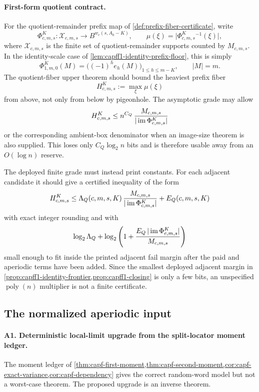 \documentclass[11pt]{article}
\theoremstyle{definition}
\theoremstyle{remark}
\newcommand{\B}{B}
\begin{document}
\paragraph{First-form quotient contract.}
For the quotient-remainder prefix map of \cref{def:prefix-fiber-certificate}, write
\[
        \Phi_{c,m,s}^{K}:\mathcal X_{c,m,s}\longrightarrow \B^{w_c(s,A_0-K)},
        \qquad
        \mu(\xi)=\bigl|\Phi_{c,m,s}^{K}{}^{-1}(\xi)\bigr|,
\]
where $\mathcal X_{c,m,s}$ is the finite set of quotient-remainder supports counted by $M_{c,m,s}$.  In the identity-scale case of \cref{lem:capff1-identity-prefix-floor}, this is simply
\[
        \Phi_{1,m,0}^{K}(M)=\bigl((-1)^he_h(M)\bigr)_{1\le h\le m-K},
        \qquad |M|=m .
\]
The quotient-fiber upper theorem should bound the heaviest prefix fiber
\[
        H_{c,m,s}^{K}:=\max_{\xi}\mu(\xi)
\]
from above, not only from below by pigeonhole.  The asymptotic grade may allow
\[
        H_{c,m,s}^{K}
        \le n^{C_Q}\,{M_{c,m,s}\over |\operatorname{im}\Phi_{c,m,s}^{K}|}
\]
or the corresponding ambient-box denominator when an image-size theorem is also supplied.  This loses only $C_Q\log_2 n$ bits and is therefore usable away from an $O(\log n)$ reserve.

The deployed finite grade must instead print constants.  For each adjacent candidate it should give a certified inequality of the form
\[
        H_{c,m,s}^{K}
        \le
        \Lambda_Q(c,m,s,K)\,{M_{c,m,s}\over |\operatorname{im}\Phi_{c,m,s}^{K}|}+E_Q(c,m,s,K)
\]
with exact integer rounding and with
\[
        \log_2\Lambda_Q+
        \log_2\left(1+{E_Q\,|\operatorname{im}\Phi_{c,m,s}^{K}|\over M_{c,m,s}}\right)
\]
small enough to fit inside the printed adjacent fail margin after the paid and aperiodic terms have been added.  Since the smallest deployed adjacent margin in \cref{prop:capff1-identity-frontier,prop:capff1-closing} is only a few bits, an unspecified $\operatorname{poly}(n)$ multiplier is not a finite certificate.

\subsection{The normalized aperiodic input}\label{subsec:capfaq-A-strategies}

\paragraph{A1. Deterministic local-limit upgrade from the split-locator moment ledger.}
The moment ledger of \cref{thm:capf-first-moment,thm:capf-second-moment,cor:capf-exact-variance,cor:capf-dependency} gives the correct random-word model but not a worst-case theorem.  The proposed upgrade is an inverse theorem.
\end{document}
